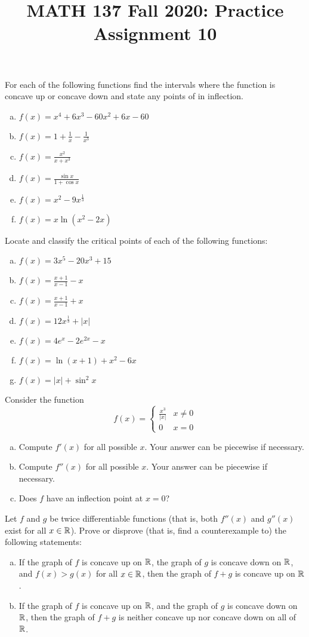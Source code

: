 
\title{MATH 137 Fall 2020: Practice Assignment 10}


\thispagestyle{firstpage}
\textbf{\@title}

\question For each of the following functions find the intervals where the function
is concave up or concave down and state any points of in inflection.
\begin{enumerate}[(a)]
  \item $f(x) = x^4+6x^3-60x^2+6x-60$
  \item $f(x) = 1+\frac{1}{x}-\frac{1}{x^3}$
  \item $f(x) = \frac{x^2}{x+x^3}$
  \item $f(x) = \frac{\sin x}{1+\cos x}$
  \item $f(x) = x^2-9x^{\frac{1}{3}}$
  \item $f(x) = x\ln(x^2-2x)$
\end{enumerate}


\question Locate and classify the critical points of each of the following functions:
\begin{enumerate}[(a)]
  \item $f(x) = 3x^5-20x^3+15$
  \item $f(x) = \frac{x+1}{x-1}-x$
  \item $f(x) = \frac{x+1}{x-1}+x$
  \item $f(x) = 12x^{\frac{1}{3}}+|x|$
  \item $f(x) = 4e^x-2e^{2x}-x$
  \item $f(x) = \ln(x+1) + x^2 - 6x$
  \item $f(x) = |x|+\sin^2 x$
\end{enumerate}


\question Consider the function
\[ f(x) = \begin{cases}
  \frac{x^3}{|x|} & x \neq 0 \\
  0               & x = 0
\end{cases} \]
\begin{enumerate}[(a)]
  \item Compute $f'(x)$ for all possible $x$. Your answer can be piecewise if necessary.
  \item Compute $f''(x)$ for all possible $x$. Your answer can be piecewise if necessary.
  \item Does $f$ have an inflection point at $x=0$?
\end{enumerate}


\question Let $f$ and $g$ be twice differentiable functions
(that is, both $f''(x)$ and $g''(x)$  exist for all $x\in\mathbb{R}$).
Prove or disprove (that is, find a counterexample to) the following statements:
\begin{enumerate}[(a)]
  \item If the graph of $f$ is concave up on $\mathbb{R}$, the graph of $g$ is concave down on $\mathbb{R}$,
        and $f(x) > g(x)$ for all $x\in\mathbb{R}$, then the graph of $f+g$ is concave up on $\mathbb{R}$.
  \item If the graph of $f$ is concave up on $\mathbb{R}$, and the graph of $g$ is concave down on $\mathbb{R}$,
        then the graph of $f+g$ is neither concave up nor concave down on all of $\mathbb{R}$.
\end{enumerate}


